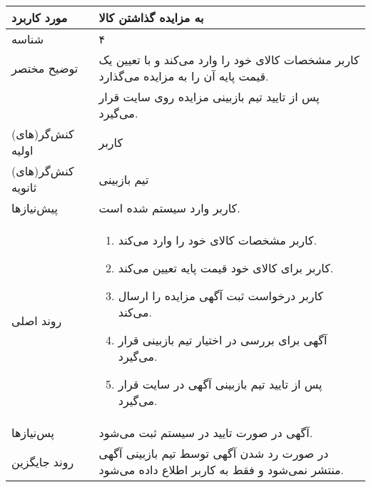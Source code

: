 \documentclass{article}
\begin{document}
\begin{center}
\bgroup
\def\arraystretch{1.5}
\begin{tabular} {|p{}|p{}|}
\hline
 مورد کاربرد & 
 به مزایده گذاشتن کالا
\\ \hline
 شناسه &
۴
\\ \hline
توضیح مختصر &
کاربر مشخصات کالای خود را وارد می‌کند و با تعیین یک قیمت پایه آن را به مزایده می‌گذارد.
\\
&
پس از تایید تیم بازبینی مزایده روی سایت قرار می‌گیرد.
\\ \hline
کنش‌گر(های) اولیه &
کاربر
\\ \hline
کنش‌گر(های) ثانویه &
تیم بازبینی
\\ \hline
پیش‌نیازها &
کاربر وارد سیستم شده است.
\\ \hline
روند اصلی &
\begin{enumerate}
\item
کاربر مشخصات کالای خود را وارد می‌کند.
\item
کاربر برای کالای خود قیمت پایه تعیین می‌کند.
\item
کاربر درخواست ثبت آگهی مزایده را ارسال می‌کند.
\item
آگهی برای بررسی در اختیار تیم بازبینی قرار می‌گیرد.
\item
پس از تایید تیم بازبینی آگهی در سایت قرار می‌گیرد.
\end{enumerate}
\\ \hline
پس‌نیازها &
آگهی در صورت تایید در سیستم ثبت می‌شود.
\\ \hline
روند جایگزین &
در صورت رد شدن آگهی توسط تیم بازبینی آگهی منتشر نمی‌شود و فقط به کاربر اطلاع داده می‌شود. 
\\ \hline
\end{tabular}
\egroup
\end{center}

\newpage
\end{document}
